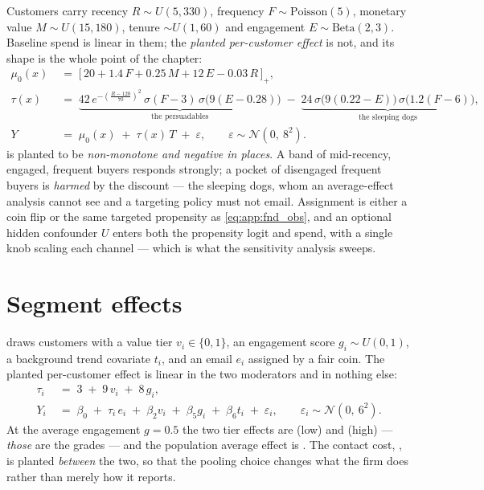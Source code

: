 Customers carry recency $R \sim U(5, 330)$, frequency $F \sim \text{Poisson}(5)$, monetary value
$M \sim U(15, 180)$, tenure $\sim U(1,60)$ and engagement $E \sim \text{Beta}(2,3)$. Baseline spend
is linear in them; the \emph{planted per-customer effect} is not, and its shape is the whole point
of the chapter:
%
\begin{align}
  \mu_0(x) &\;=\; \big[\,20 + 1.4\,F + 0.25\,M + 12\,E - 0.03\,R\,\big]_{+}, \label{eq:app:up_mu}\\
  \tau(x)  &\;=\; \underbrace{42\, e^{-\left(\frac{R - 120}{70}\right)^{2}}
                   \,\sigma(F - 3)\,\sigma\big(9(E - 0.28)\big)}_{\text{the persuadables}}
              \;-\; \underbrace{24\,\sigma\big(9(0.22 - E)\big)\,\sigma\big(1.2(F - 6)\big)}
                   _{\text{the sleeping dogs}}, \label{eq:app:up_tau}\\
  Y &\;=\; \mu_0(x) \;+\; \tau(x)\,T \;+\; \varepsilon,
       \qquad \varepsilon \sim \mathcal N\!\left(0,\ 8^{2}\right). \label{eq:app:up_y}
\end{align}
%
 is planted to be \emph{non-monotone and negative in places}. A band of
mid-recency, engaged, frequent buyers responds strongly; a pocket of disengaged frequent buyers is
\emph{harmed} by the discount --- the sleeping dogs, whom an average-effect analysis cannot see
and a targeting policy must not email. Assignment is either a coin flip or the same targeted
propensity as \cref{eq:app:fnd_obs}, and an optional hidden confounder $U$ enters both the
propensity logit and spend, with a single knob scaling each channel --- which is what the
sensitivity analysis sweeps.

\section{Segment effects}
\label{app:dgp:seg}

 draws \nbTwoN{} customers with a value tier $v_i \in \{0,1\}$, an engagement
score $g_i \sim U(0,1)$, a background trend covariate $t_i$, and an email $e_i$ assigned by a fair
coin. The planted per-customer effect is linear in the two moderators and in nothing else:
%
\begin{align}
  \tau_i &\;=\; 3 \;+\; 9\,v_i \;+\; 8\,g_i, \label{eq:app:seg_tau}\\
  Y_i &\;=\; \beta_0 \;+\; \tau_i\,e_i \;+\; \beta_2 v_i \;+\; \beta_5 g_i \;+\; \beta_6 t_i
             \;+\; \varepsilon_i,
       \qquad \varepsilon_i \sim \mathcal N\!\left(0,\ 6^{2}\right). \label{eq:app:seg_y}
\end{align}
%
At the average engagement $g = 0.5$ the two tier effects are \eur{\nbTwoTrueLow} (low) and
\eur{\nbTwoTrueHigh} (high) --- \emph{those} are the grades --- and the population average effect
is \eur{\nbTwoTrueAte}. The contact cost, \eur{\nbTwoCost}, is planted \emph{between} the two, so
that the pooling choice changes what the firm does rather than merely how it reports.

